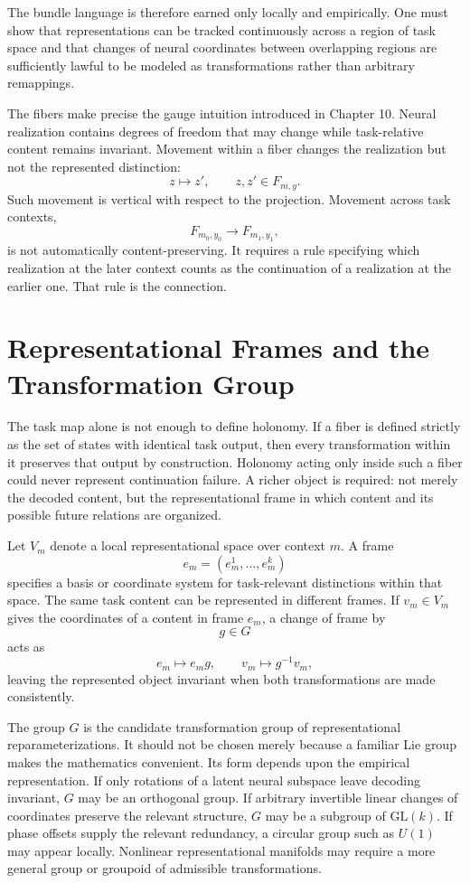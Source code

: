 \documentclass[11pt]{book}
\begin{document}
The bundle language is therefore earned only locally and empirically. One must show that representations can be tracked continuously across a region of task space and that changes of neural coordinates between overlapping regions are sufficiently lawful to be modeled as transformations rather than arbitrary remappings.

The fibers make precise the gauge intuition introduced in Chapter 10. Neural realization contains degrees of freedom that may change while task-relative content remains invariant. Movement within a fiber changes the realization but not the represented distinction:
\[
z\mapsto z',
\qquad
z,z'\in F_{m,y}.
\]
Such movement is vertical with respect to the projection. Movement across task contexts,
\[
F_{m_0,y_0}\longrightarrow F_{m_1,y_1},
\]
is not automatically content-preserving. It requires a rule specifying which realization at the later context counts as the continuation of a realization at the earlier one. That rule is the connection.

\section*{Representational Frames and the Transformation Group}

The task map alone is not enough to define holonomy. If a fiber is defined strictly as the set of states with identical task output, then every transformation within it preserves that output by construction. Holonomy acting only inside such a fiber could never represent continuation failure. A richer object is required: not merely the decoded content, but the representational frame in which content and its possible future relations are organized.

Let $V_m$ denote a local representational space over context $m$. A frame
\[
e_m=(e_m^1,\ldots,e_m^k)
\]
specifies a basis or coordinate system for task-relevant distinctions within that space. The same task content can be represented in different frames. If $v_m\in V_m$ gives the coordinates of a content in frame $e_m$, a change of frame by
\[
g\in G
\]
acts as
\[
e_m\mapsto e_m g,
\qquad
v_m\mapsto g^{-1}v_m,
\]
leaving the represented object invariant when both transformations are made consistently.

The group $G$ is the candidate transformation group of representational reparameterizations. It should not be chosen merely because a familiar Lie group makes the mathematics convenient. Its form depends upon the empirical representation. If only rotations of a latent neural subspace leave decoding invariant, $G$ may be an orthogonal group. If arbitrary invertible linear changes of coordinates preserve the relevant structure, $G$ may be a subgroup of $\mathrm{GL}(k)$. If phase offsets supply the relevant redundancy, a circular group such as $U(1)$ may appear locally. Nonlinear representational manifolds may require a more general group or groupoid of admissible transformations.
\end{document}
